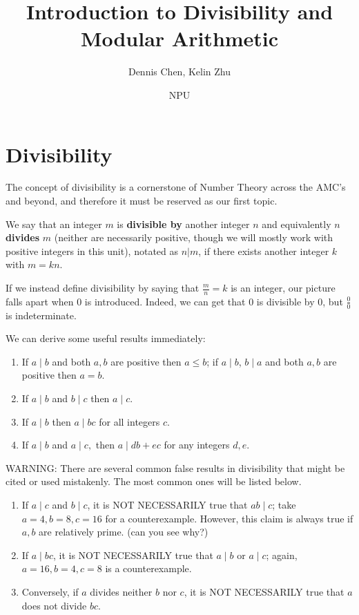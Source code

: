 \documentclass[mast]{lucky}
\title{Introduction to Divisibility and Modular Arithmetic}
\author{Dennis Chen, Kelin Zhu}
\date{NPU}
\begin{document}
\maketitle
\section{Divisibility}
The concept of divisibility is a cornerstone of Number Theory across the AMC's and beyond, and therefore it must be reserved as our first topic.
\begin{defi}[Divisibility]
We say that an integer $m$ is \textbf{divisible by} another integer $n$ and equivalently $n$ \textbf{divides} $m$ (neither are necessarily positive, though we will mostly work with positive integers in this unit), notated as $n|m$, if there exists another integer $k$ with $m=kn$.
\end{defi}
\begin{remark}
If we instead define divisibility by saying that $\frac{m}{n}=k$ is an integer, our picture falls apart when 0 is introduced. Indeed, we can get that $0$ is divisible by $0$, but $\frac{0}{0}$ is indeterminate.
\end{remark}

We can derive some useful results immediately:
\begin{fact}
\hfill
\begin{enumerate}
    \item If $a\mid b$ and both $a,b$ are positive then $a\le b$; if $a\mid b$, $b\mid a$ and both $a,b$ are positive then $a=b$.
    \item If $a\mid b$ and $b\mid c$ then $a\mid c.$
    \item If $a\mid b$ then $a\mid bc$ for all integers $c.$
    \item If $a\mid b$ and $a\mid c,$ then $a\mid db+ec$ for any integers $d,e$.
\end{enumerate}
\end{fact}

WARNING: There are several common false results in divisibility that might be cited or used mistakenly. The most common ones will be listed below.
\begin{enumerate}
\item If $a\mid c$ and $b\mid c$, it is NOT NECESSARILY true that $ab\mid c$; take $a=4,b=8,c=16$ for a counterexample. However, this claim is always true if $a,b$ are relatively prime. (can you see why?)
\item If $a\mid bc$, it is NOT NECESSARILY true that $a\mid b$ or $a\mid c$; again, $a=16, b=4, c=8$ is a counterexample.
\item Conversely, if $a$ divides neither $b$ nor $c$, it is NOT NECESSARILY true that $a$ does not divide $bc$.
\end{enumerate}
\end{document}
